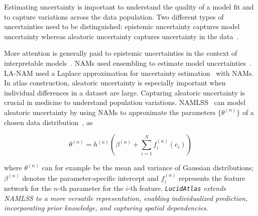 Estimating uncertainty is important to understand the quality of a model fit and to capture variations across the data population. Two different types of uncertainties need to be distinguished: epistemic uncertainty captures model uncertainty whereas aleatoric uncertainty captures uncertainty in the data~\citep{hullermeier2021survey}. 

More attention is generally paid to epistemic uncertainties in the context of interpretable models~\citep{wang2025uncertaintysurvey}. NAMs used ensembling to estimate model uncertainties~\citep{agarwal2020neural}. LA-NAM used a Laplace approximation for uncertainty estimation~\citep{bouchiat2023lanam} with NAMs. In atlas construction, aleatoric uncertainty is especially important when individual differences in a dataset are large. Capturing aleatoric uncertainty is crucial in medicine to understand population variations. NAMLSS~\citep{thielmann2024namlss} can model aleatoric uncertainty by using NAMs to approximate the parameters $\{\theta^{(n)}\}$ of a chosen data distribution~\citep{thielmann2024namlss}, as
\begin{small}
\begin{equation}
\theta^{(n)}=h^{(n)}\left(\beta^{(n)}+\sum_{i=1}^{N} f_{i}^{(n)}\left(c_{i}\right)\right) 
\label{eq.namlss}
\end{equation}
\end{small}
where $\theta^{(n)}$ can for example be the mean and variance of Gaussian distributions; $\beta^{(n)}$ denotes the parameter-specific intercept and $f_{i}^{(n)}$ represents the feature network for the $n$-th parameter for the $i$-th feature. \emph{\texttt{LucidAtlas} extends NAMLSS to a more versatile representation, enabling individualized prediction, incorporating prior knowledge, and capturing spatial dependencies.}

